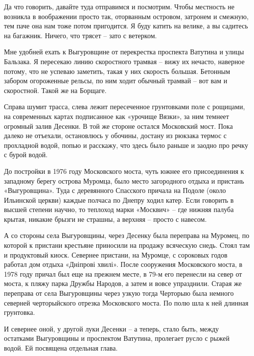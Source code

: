 Да что говорить, давайте туда отправимся и посмотрим. Чтобы местность не возникла в воображении просто так, оторванным островом, затронем и смежную, тем паче она нам тоже потом пригодится. Я буду катить на велике, а вы садитесь на багажник. Ничего, что трясет – зато с ветерком.

Мне удобней ехать к Выгуровщине от перекрестка проспекта Ватутина и улицы Бальзака. Я пересекаю линию скоростного трамвая – вижу их нечасто, наверное потому, что не успеваю заметить, такая у них скорость большая. Бетонным забором огороженные рельсы, по ним ходит обычный трамвай – вот вам и скоростной. Такой же на Борщаге.

Справа шумит трасса, слева лежит пересеченное грунтовками поле с рощицами, на современных картах подписанное как «урочище Вязки», за ним темнеет огромный залив Десенки. В той же стороне остался Московский мост. Пока далеко не отъехали, остановлюсь у обочины, достану из рюкзака термос с прохладной водой, попью и расскажу, что здесь было раньше и заодно про речку с бурой водой.

До постройки в 1976 году Московского моста, чуть южнее его присоединения к западному берегу острова Муромца, было место загородного отдыха и пристань «Выгуровщина». Туда с деревянного Спасского причала на Подоле (около Ильинской церкви) каждые полчаса по Днепру ходил катер. Если говорить в высшей степени научно, то теплоход марки «Москвич» – где нижняя палуба крытая, никакие брызги не страшны, а верхняя – просто с навесом. 

А со стороны села Выгуровщины, через Десенку была переправа на Муромец, по которой к пристани крестьяне приносили на продажу всяческую снедь. Стоял там и продуктовый киоск. Севернее пристани, на Муромце, с сороковых годов работал дом отдыха «Дніпрові хвилі». После сооружения Московского моста, в 1978 году причал был еще на прежнем месте, в 79-м его перенесли на север от моста, к пляжу парка Дружбы Народов, а затем и вовсе упразднили. Старая же переправа от села Выгуровщины через узкую тогда Черторыю была немного северней черторыйского отрезка Московского моста. По полю шла к ней длинная грунтовка.

И севернее оной, у другой луки Десенки – а теперь, стало быть, между остатками Выгуровщины и проспектом Ватутина, пролегает русло с рыжей водой. Ей посвящена отдельная глава.


